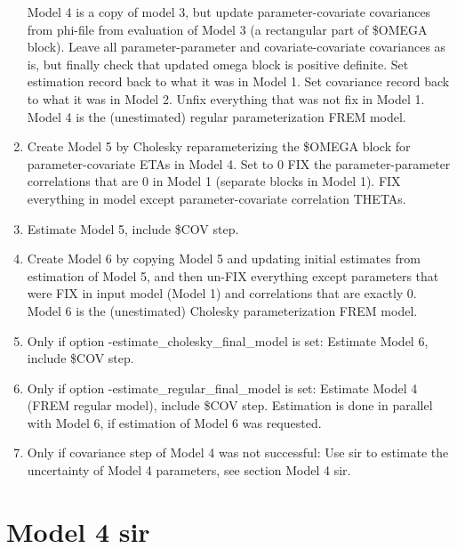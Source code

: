 \begin{enumerate}
Model 4 is a copy of model 3, but update parameter-covariate covariances from phi-file from evaluation of Model 3
(a rectangular part of \$OMEGA block).
Leave all parameter-parameter and covariate-covariate covariances as is, but
finally check that updated omega block is positive definite.
Set estimation record back to what it was in Model 1.
Set covariance record back to what it was in Model 2.
Unfix everything that was not fix in Model 1.
Model 4 is the (unestimated) regular parameterization FREM model.
\item
Create Model 5 by
Cholesky reparameterizing the \$OMEGA block
for parameter-covariate ETAs in Model 4.
Set to 0 FIX the parameter-parameter correlations that are 0 in Model 1 (separate blocks in Model 1).
FIX everything in model except parameter-covariate correlation THETAs.
\item Estimate Model 5, include \$COV step.
\item Create Model 6 
by copying Model 5 and updating initial estimates from
estimation of Model 5, and then un-FIX everything except parameters that
were FIX in input model (Model 1) and correlations that are exactly 0.
Model 6 is the (unestimated) Cholesky parameterization FREM model.
\item Only if option -estimate\_cholesky\_final\_model is set:
Estimate Model 6, include \$COV step.
\item Only if option -estimate\_regular\_final\_model is set:
Estimate Model 4 (FREM regular model), include \$COV step.
Estimation is done in parallel with Model 6, if estimation of Model 6 was requested.
\item Only if covariance step of Model 4 was not successful:
Use sir to estimate the uncertainty of Model 4 parameters, see section Model 4 sir.
\end{enumerate}

\section{Model 4 sir}

